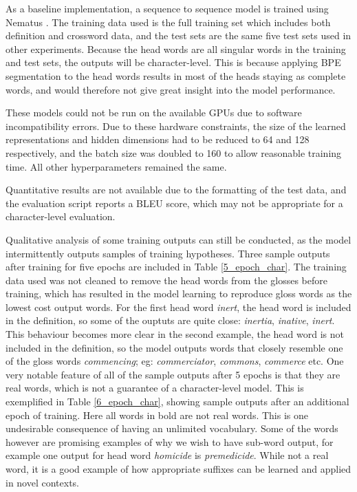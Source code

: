 \documentclass[11pt]{article}
\begin{document}
\begin{spacing}{1}
As a baseline implementation, a sequence to sequence model is trained using Nematus \cite{sennrich-EtAl:2017:EACLDemo}. The training data used is the full training set which includes both definition and crossword data, and the test sets are the same five test sets used in other experiments. Because the head words are all singular words in the training and test sets, the outputs will be character-level. This is because applying BPE segmentation to the head words results in most of the heads staying as complete words, and would therefore not give great insight into the model performance. 

These models could not be run on the available GPUs due to software incompatibility errors. Due to these hardware constraints, the size of the learned representations and hidden dimensions had to be reduced to 64 and 128 respectively, and the batch size was doubled to 160 to allow reasonable training time. All other hyperparameters remained the same.

Quantitative results are not available due to the formatting of the test data, and the evaluation script reports a BLEU score, which may not be appropriate for a character-level evaluation.

Qualitative analysis of some training outputs can still be conducted, as the model intermittently outputs samples of training hypotheses. Three sample outputs after training for five epochs are included in Table \ref{5_epoch_char}. The training data used was not cleaned to remove the head words from the glosses before training, which has resulted in the model learning to reproduce gloss words as the lowest cost output words. For the first head word \textit{inert}, the head word is included in the definition, so some of the ouptuts are quite close: \textit{inertia}, \textit{inative}, \textit{inert}. This behaviour becomes more clear in the second example, the head word is not included in the definition, so the model outputs words that closely resemble one of the gloss words \textit{commencing}; eg: \textit{commerciator}, \textit{commons}, \textit{commerce} etc. One very notable feature of all of the sample outputs after 5 epochs is that they are real words, which is not a guarantee of a character-level model. This is exemplified in Table \ref{6_epoch_char}, showing sample outputs after an additional epoch of training. Here all words in bold are not real words. This is one undesirable consequence of having an unlimited vocabulary. Some of the words however are promising examples of why we wish to have sub-word output, for example one output for head word \textit{homicide} is \textit{premedicide}. While not a real word, it is a good example of how appropriate suffixes can be learned and applied in novel contexts. 


\end{spacing}
\end{document}
